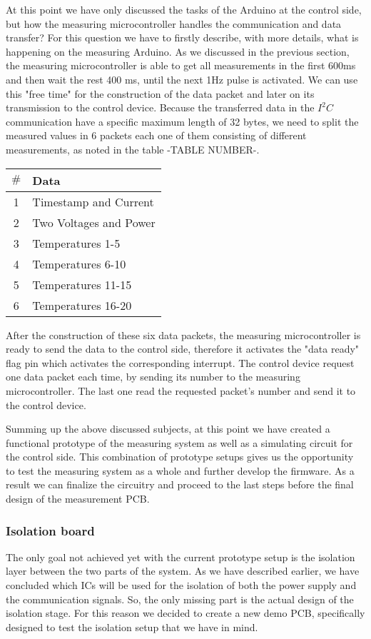 At this point we have only discussed the tasks of the Arduino at the control side, but how the measuring microcontroller handles the communication and data transfer? For this question we have to firstly describe, with more details, what is happening on the measuring Arduino. As we discussed in the previous section, the measuring microcontroller is able to get all measurements in the first 600ms and then wait the rest 400 ms, until the next 1Hz pulse is activated. We can use this "free time"  for the construction of the data packet and later on its  transmission to the control device. Because the transferred data in the $I^2C$ communication have a specific maximum length of 32 bytes, we need to split the measured values in 6 packets each one of them consisting of different measurements, as noted in the table -TABLE NUMBER-.

\begin{center}
\begin{tabular}{ c l } 
 $\#$ & Data \\ \hline
 1 &  Timestamp and Current\\
 2 &  Two Voltages and Power\\
 3 &  Temperatures 1-5\\
 4 &  Temperatures 6-10\\
 5 &  Temperatures 11-15\\
 6 &  Temperatures 16-20\\
\end{tabular}
\end{center}

After the construction of these six data packets, the measuring microcontroller is ready to send the data to the control side, therefore it activates the "data ready" flag pin which activates the corresponding interrupt. The control device request one data packet each time, by sending its number to the measuring microcontroller. The last one read the requested packet's number and send it to the control device.

Summing up the above discussed subjects, at this point we have created a functional prototype of the measuring system as well as a simulating circuit for the control side. This combination of prototype setups gives us the opportunity to test the measuring system as a whole and further develop the firmware. As a result we can finalize the circuitry and proceed to the last steps before the final design of the measurement PCB.

\subsubsection{Isolation board}
The only goal not achieved yet with the current prototype setup is the isolation layer between the two parts of the system. As we have described earlier, we have concluded which ICs will be used for the isolation of both the power supply and the communication signals. So, the only missing part is the actual design of the isolation stage. For this reason we decided to create a new demo PCB, specifically designed to test the isolation setup that we have in mind.

